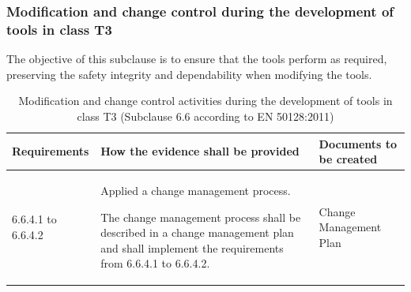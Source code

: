\documentclass{template/openetcs_report}
\begin{document}
\subsubsection{Modification and change control during the development of tools in class T3}
\begin{flushleft}
The objective of this subclause is to ensure that the tools perform as required, preserving the safety integrity and dependability when modifying the tools.
\end{flushleft}
{\footnotesize\sffamily\centering
\begin{longtable}{|p{2cm}|p{9cm}|p{3cm}|}
\caption{Modification and change control activities during the development of tools in class T3 (Subclause 6.6 according to EN 50128:2011)}\\
\hline
\bfseries Requirements & \bfseries How the evidence shall be provided & \bfseries Documents to be created\\
\hline
\hline
\endhead
\hline
\endfoot

6.6.4.1 to 6.6.4.2 & Applied a change management process.

The change management process shall be described in a  change management plan and shall implement the requirements from 6.6.4.1 to 6.6.4.2.
& Change Management Plan\\ 
\hline
\end{longtable}}
\end{document}
